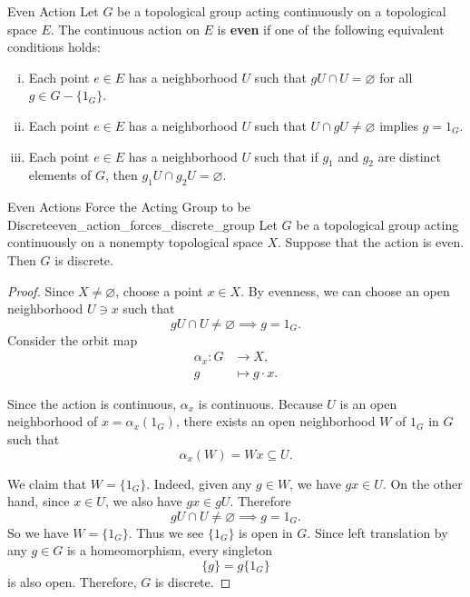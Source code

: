\documentclass{report}
\begin{document}
\begin{definition}{Even Action}{}
	Let $G$ be a topological group acting continuously on a topological space $E$. The continuous action on $E$ is \textbf{even} if one of the following equivalent conditions holds:
	\begin{enumerate}[(i)]
		\item Each point $e \in E$ has a neighborhood $U$ such that $gU\cap U=\varnothing$ for all $g\in G-\{1_G\}$.
		\item Each point $e \in E$ has a neighborhood $U$ such that $U \cap gU \neq \varnothing$ implies $g=1_G$.
		\item Each point $e \in E$ has a neighborhood $U$ such that if $g_1$ and $g_2$ are distinct elements of $G$, then $g_1 U\cap g_2U =\varnothing$.
	\end{enumerate}
\end{definition}

\begin{proposition}{Even Actions Force the Acting Group to be Discrete}{even_action_forces_discrete_group}
	Let \(G\) be a topological group acting continuously on a nonempty topological space \(X\). Suppose that the action is even. Then \(G\) is discrete.
\end{proposition}
\begin{proof}
	Since \(X\neq\varnothing\), choose a point \(x\in X\). By evenness, we can choose an open neighborhood \(U\ni x\) such that
	\[
		gU\cap U\neq\varnothing \implies g=1_G.
	\]
	Consider the orbit map
	\begin{align*}
		\alpha_x:G&\longrightarrow X,
		\\
		g&\longmapsto g\cdot x.
	\end{align*}
		
	Since the action is continuous, \(\alpha_x\) is continuous. Because \(U\) is an
	open neighborhood of \(x=\alpha_x(1_G)\), there exists an open neighborhood
	\(W\) of \(1_G\) in \(G\) such that
	\[
		\alpha_x(W)=Wx\subseteq U.
	\]

	We claim that \(W=\{1_G\}\). Indeed, given any \(g\in W\), we have \(gx\in U\). On the other hand, since \(x\in U\), we also have $gx\in gU$. Therefore
	\[
		gU\cap U\neq\varnothing\implies g=1_G.
	\]
	So we have \(W=\{1_G\}\). Thus we see \(\{1_G\}\) is open in \(G\). Since left translation by any \(g\in G\) is a homeomorphism, every singleton
	\[
		\{g\}=g\{1_G\}
	\]
	is also open. Therefore, \(G\) is discrete.
\end{proof}
\end{document}
